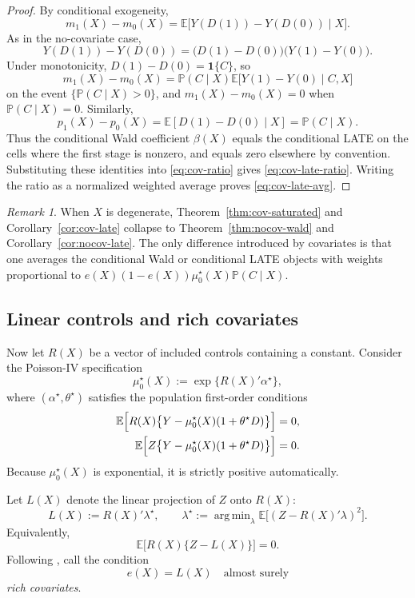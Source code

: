 \documentclass[11pt]{article}
\numberwithin{equation}{section}
\newcommand{\E}{\mathbb E}
\newcommand{\PP}{\mathbb P}
\newcommand{\1}{\mathbf 1}
\DeclareMathOperator*{\argmin}{arg\,min}
\theoremstyle{remark}
\newtheorem{remark}[assumption]{Remark}
\begin{document}
\begin{proof}
By conditional exogeneity,
\[
m_1(X)-m_0(X)
= \E\bigl[Y(D(1))-Y(D(0))\mid X\bigr].
\]
As in the no-covariate case,
\[
Y(D(1))-Y(D(0)) = \bigl(D(1)-D(0)\bigr)\bigl(Y(1)-Y(0)\bigr).
\]
Under monotonicity, $D(1)-D(0)=\1\{C\}$, so
\[
m_1(X)-m_0(X)
= \PP(C\mid X)\E\bigl[Y(1)-Y(0)\mid C,X\bigr]
\]
on the event $\{\PP(C\mid X)>0\}$, and $m_1(X)-m_0(X)=0$ when $\PP(C\mid X)=0$.
Similarly,
\[
p_1(X)-p_0(X) = \E[D(1)-D(0)\mid X] = \PP(C\mid X).
\]
Thus the conditional Wald coefficient $\beta(X)$ equals the conditional LATE on the
cells where the first stage is nonzero, and equals zero elsewhere by convention.
Substituting these identities into \eqref{eq:cov-ratio} gives
\eqref{eq:cov-late-ratio}. Writing the ratio as a normalized weighted average proves
\eqref{eq:cov-late-avg}.
\end{proof}

\begin{remark}\label{rem:cov-benchmark}
When $X$ is degenerate, Theorem~\ref{thm:cov-saturated} and
Corollary~\ref{cor:cov-late} collapse to Theorem~\ref{thm:nocov-wald} and
Corollary~\ref{cor:nocov-late}. The only difference introduced by covariates is that
one averages the conditional Wald or conditional LATE objects with weights
proportional to $e(X)(1-e(X))\mu_0^\star(X)\PP(C\mid X)$.
\end{remark}

\subsection{Linear controls and rich covariates}

Now let $R(X)$ be a vector of included controls containing a constant. Consider the
Poisson-IV specification
\[
\mu_0^\star(X) := \exp\{R(X)'\alpha^\star\},
\]
where $(\alpha^\star,\theta^\star)$ satisfies the population first-order conditions
\begin{align}
\E\Bigl[R(X)\bigl\{Y-\mu_0^\star(X)(1+\theta^\star D)\bigr\}\Bigr] &= 0,
\label{eq:lin-mean}\\
\E\Bigl[Z\bigl\{Y-\mu_0^\star(X)(1+\theta^\star D)\bigr\}\Bigr] &= 0.
\label{eq:lin-iv}
\end{align}
Because $\mu_0^\star(X)$ is exponential, it is strictly positive automatically.

Let $L(X)$ denote the linear projection of $Z$ onto $R(X)$:
\[
L(X) := R(X)'\lambda^\star,
\qquad
\lambda^\star := \argmin_{\lambda}\E\bigl[(Z-R(X)'\lambda)^2\bigr].
\]
Equivalently,
\[
\E\bigl[R(X)\{Z-L(X)\}\bigr] = 0.
\]
Following \cite{blandhol2022tsls}, call the condition
\begin{equation}\label{eq:rich}
e(X) = L(X) \quad \text{almost surely}
\end{equation}
\emph{rich covariates}.
\end{document}
